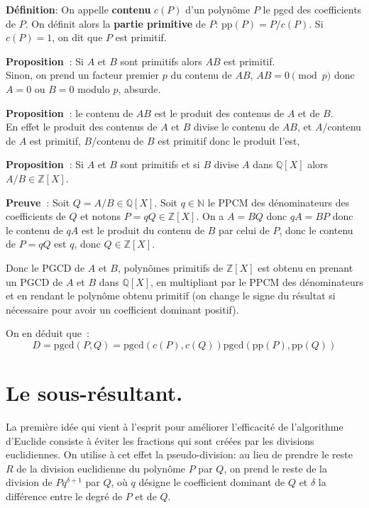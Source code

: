 \documentclass[a4paper,11pt]{book}
\begin{document}
\begin{giacjshere}
{\bf{Définition}}: On appelle {\bf contenu} $c ( P )$ d'un polynôme $P$ le
pgcd des coefficients de $P$. On définit alors la 
{\bf partie primitive} de $P$:
pp$( P ) = P / c ( P )$. Si $c(P)=1$, on dit que $P$ est primitif.

{\bf Proposition~}: Si $A$ et $B$ sont primitifs alors $AB$ est
primitif.\\
Sinon, on prend un facteur premier $p$ du contenu de $AB$, 
$AB=0 \pmod p$ donc $A=0$ ou $B=0$ modulo $p$, absurde.

{\bf Proposition~}: le contenu de $AB$ est le produit des contenus
de $A$ et de $B$.\\
En effet le produit des contenus de $A$ et $B$ divise le contenu de $AB$,
et $A$/contenu de $A$ est primitif, $B$/contenu de $B$ est primitif
donc le produit l'est,

{\bf Proposition~}: Si $A$ et $B$ sont primitifs et si $B$ divise $A$
dans $\mathbb{Q}[X]$ alors $A/B \in \mathbb{Z}[X]$.

{\bf Preuve~}: Soit $Q=A/B \in \mathbb{Q}[X]$. Soit $q \in \mathbb{N} $ le PPCM des
d\'enominateurs des coefficients de $Q$ et notons $P=qQ \in \mathbb{Z}[X]$.
On a $A=BQ$ donc $qA=BP$ donc le contenu de $qA$ est le produit 
du contenu de $B$ par celui de $P$, donc le contenu de $P=qQ$ est $q$,
donc $Q \in \mathbb{Z}[X]$.

Donc le PGCD de $A$ et $B$, polyn\^omes primitifs de $\mathbb{Z}[X]$ est
obtenu en prenant un PGCD de $A$ et $B$ dans $\mathbb{Q}[X]$, en multipliant
par le PPCM des d\'enominateurs et en rendant le polyn\^ome obtenu
primitif (on change le signe du r\'esultat si n\'ecessaire pour avoir
un coefficient dominant positif).

On en d\'eduit que~:
\[ D = \mbox{pgcd} ( P, Q ) = \mbox{pgcd} ( c ( P ), c ( Q )) \mbox{pgcd} (
   \mbox{pp} ( P ), \mbox{pp} ( Q )) \]


\section{Le sous-résultant.}

La première idée qui vient à l'esprit pour améliorer l'efficacité de
l'algorithme d'Euclide consiste à éviter les fractions qui sont créées par les
divisions euclidiennes. On utilise à cet effet la pseudo-division: au lieu de
prendre le reste $R$ de la division euclidienne du polynôme $P$ par $Q$, on
prend le reste de la division de $P q^{\delta + 1}$ par $Q$, où $q$ désigne le
coefficient dominant de $Q$ et $\delta$ la différence entre le degré de $P$ et
de $Q$.


\end{giacjshere}
\end{document}
